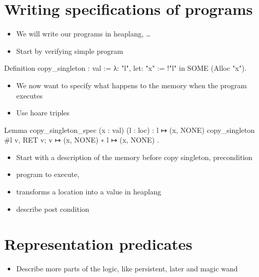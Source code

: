\documentclass[thesis.tex]{subfiles}
\begin{document}
\section{Writing specifications of programs}
\label{sec:hoare}
\begin{itemize}
  \item We will write our programs in heaplang, \ldots
  \item Start by verifying simple program
\end{itemize}
\begin{coqcode}
Definition copy_singleton : val :=
  λ: "l", let: "x" := !"l" in
          SOME (Alloc "x").
\end{coqcode}
\begin{itemize}
  \item We now want to specify what happens to the memory when the program executes
  \item Use hoare triples
\end{itemize}
\begin{coqcode}
Lemma copy_singleton_spec (x : val) (l : loc) :
  {{{ l ↦ (x, NONE) }}}
    copy_singleton #l
  {{{ v, RET v; v ↦ (x, NONE) ∗ l ↦ (x, NONE) }}}.
\end{coqcode}
\begin{itemize}
  \item Start with a description of the memory before copy singleton, precondition
  \item program to execute,
  \item {} transforms a location into a value in heaplang
  \item describe post condition
\end{itemize}

\section{Representation predicates}
\label{sec:represpreds}
\begin{itemize}
  \item Describe more parts of the logic, like persistent, later and magic wand
\end{itemize}
\end{document}
